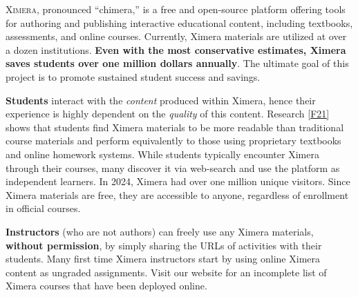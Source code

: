 \documentclass[twocolumn]{article}
\begin{document}
\pagestyle{main}
\thispagestyle{title}
\noindent
\lettrine[lines=2]{X}{imera}, pronounced ``chimera,'' is a free and
open-source platform offering tools for authoring and publishing
interactive educational content, including textbooks, assessments, and
online
courses. Currently, Ximera materials are utilized at over a dozen
institutions. \textbf{Even with the most conservative estimates, Ximera saves
    students
    over one million dollars annually}. The ultimate goal of this project is to
promote sustained student success and savings.

\vspace{.2cm}

\begin{xframe}
    {\sffamily\bfseries Students} interact with the \textit{content} produced within
    Ximera, hence their experience is highly dependent on the \textit{quality} of this
    content. Research \ref{F21} shows that students find Ximera materials to be more readable
    than traditional course materials and perform equivalently to those using
    proprietary textbooks and online homework systems. While students typically
    encounter Ximera through their courses, many discover it via web-search and
    use the platform as independent learners. In 2024, Ximera had over one million
    unique visitors. Since Ximera materials are free, they are accessible to
    anyone, regardless of enrollment in official courses.
\end{xframe}
\begin{xframe}
    {\sffamily\bfseries Instructors} (who are not authors) can freely use
    any Ximera materials,
    \textbf{without permission}, by simply sharing the URLs of activities
    with their students. Many first time Ximera instructors start  by
    using online Ximera content as
    ungraded assignments. Visit our website for an incomplete list of
    Ximera courses that have been deployed online.
\end{xframe}
\end{document}
